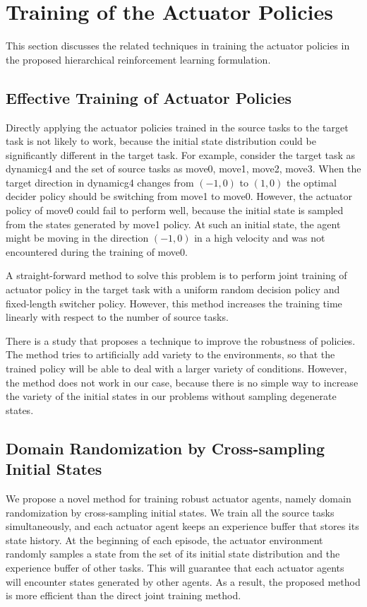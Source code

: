 \section{Training of the Actuator Policies}
This section discusses the related techniques in training the actuator policies in the proposed hierarchical reinforcement learning formulation.
\subsection{Effective Training of Actuator Policies}
Directly applying the actuator policies trained in the source tasks to the target task is not likely to work, because the initial state distribution could be significantly different in the target task.
For example, consider the target task as dynamicg4 and the set of source tasks as move0, move1, move2, move3. When the target direction in dynamicg4 changes from $(-1,0)$ to $(1,0)$ the optimal decider policy should be switching from move1 to move0. However, the actuator policy of move0 could fail to perform well, because the initial state is sampled from the states generated by move1 policy. At such an initial state, the agent might be moving in the direction $(-1,0)$ in a high velocity and was not encountered during the training of move0.

A straight-forward method to solve this problem is to perform joint training of actuator policy in the target task with a uniform random decision policy and fixed-length switcher policy. However, this method increases the training time linearly with respect to the number of source tasks.

There is a study \cite{tobin2017domain} that proposes a technique to improve the robustness of policies. The method tries to artificially add variety to the environments, so that the trained policy will be able to deal with a larger variety of conditions. However, the method does not work in our case, because there is no simple way to increase the variety of the initial states in our problems without sampling degenerate states. 

\subsection{Domain Randomization by Cross-sampling Initial States}
We propose a novel method for training robust actuator agents, namely domain randomization by cross-sampling initial states. We train all the source tasks simultaneously, and each actuator agent keeps an experience buffer that stores its state history. At the beginning of each episode, the actuator environment randomly samples a state from the set of its initial state distribution and the experience buffer of other tasks. This will guarantee that each actuator agents will encounter states generated by other agents. As a result, the proposed method is more efficient than the direct joint training method.
